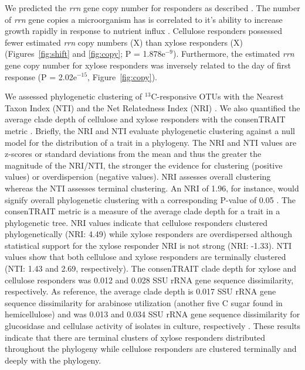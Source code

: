We predicted the \textit{rrn} gene copy number for responders as described
\citep{Kembel_2012}. The number of \textit{rrn} gene copies
a microorganism has is correlated to it's ability to increase growth
rapidly in response to nutrient influx \citep{Klappenbach_2000}. Cellulose
responders possessed fewer estimated \textit{rrn} copy numbers (X) than xylose
responders (X) (Figures~\ref{fig:shift} and \ref{fig:copy};
P = 1.878e$^{-9}$). Furthermore, the estimated \textit{rrn} gene copy
number for xylose responders was inversely related to the day of first
response (P = 2.02e$^{-15}$, Figure~\ref{fig:copy}).

We assessed phylogenetic clustering of $^{13}$C-responsive OTUs with the
Nearest Taxon Index (NTI) and the Net Relatedness Index (NRI)
\citep{Webb2000}. We also quantified the average clade depth of cellulose and
xylose responders with the consenTRAIT metric \citep{Martiny2013}. Briefly, the
NRI and NTI evaluate phylogenetic clustering against a null model for the
distribution of a trait in a phylogeny. The NRI and NTI values are z-scores or
standard deviations from the mean and thus the greater the magnitude of the
NRI/NTI, the stronger the evidence for clustering (positive values) or
overdispersion (negative values). NRI assesses overall clustering whereas the
NTI assesses terminal clustering. An NRI of 1.96, for instance, would signify
overall phylogenetic clustering with a corresponding P-value of 0.05
\citep{Evans2014a}. The consenTRAIT metric is a measure of the average clade
depth for a trait in a phylogenetic tree. NRI values indicate that cellulose
responders clustered phylogenetically (NRI: 4.49) while xylose responders are
overdispersed although statistical support for the xylose responder NRI is not
strong (NRI: -1.33). NTI values show that both cellulose and xylose responders
are terminally clustered (NTI: 1.43 and 2.69, respectively). The consenTRAIT
clade depth for xylose and cellulose responders was 0.012 and 0.028 SSU rRNA
gene sequence dissimilarity, respectively. As reference, the average clade
depth is 0.017 SSU rRNA gene sequence dissimilarity for arabinose
utilization (another five C sugar found in hemicellulose) and was 0.013
and 0.034 SSU rRNA gene sequence dissimilarity for glucosidase and
cellulase activity of isolates in culture, respectively
\citep{Martiny2013,Berlemont2013}. These results indicate that there are
terminal clusters of xylose responders distributed throughout the
phylogeny while cellulose responders are clustered terminally and deeply
with the phylogeny.

